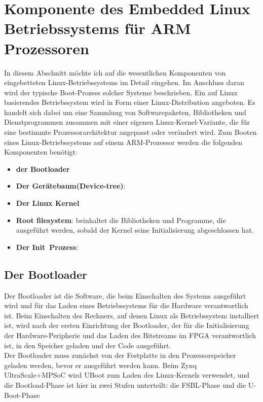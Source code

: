 \section{Komponente des Embedded Linux Betriebssystems für ARM Prozessoren}
\label{cha:tech_grund:sec:Komponente_eines_Emb_Lin_Sys}
In diesem Abschnitt möchte ich auf die wesentlichen Komponenten von eingebetteten Linux-Betriebssystems im Detail eingehen. Im Anschluss daran wird der typische Boot-Prozess solcher Systeme beschrieben.
Ein auf Linux basierendes Betriebssystem wird in Form einer Linux-Distribution angeboten. Es handelt sich dabei um eine Sammlung von Softwarepaketen, Bibliotheken und Dienstprogrammen zusammen mit einer eigenen Linux-Kernel-Variante, die für eine bestimmte Prozessorarchitektur angepasst oder verändert wird. 
Zum Booten eines Linux-Betriebssystems auf einem ARM-Prozessor werden die folgenden Komponenten benötigt:

\begin{itemize}
	\item \textbf{der Bootloader} 
	\item \textbf{Der Gerätebaum(Device-tree)}:
	\item \textbf{Der Linux Kernel}
	\item \textbf{Root filesystem}: beinhaltet die Bibliotheken und Programme, die ausgeführt werden, sobald der Kernel seine Initialisierung abgeschlossen hat.
	\item \textbf{Der \grqq Init\grqq\ Prozess}:
\end{itemize}

\subsection{Der Bootloader}
\cite{Dervis2013}Der Bootloader ist die Software, die beim Einschalten des Systems ausgeführt wird und für das Laden eines Betriebssystems für die Hardware verantwortlich ist. Beim Einschalten des Rechners, auf denen Linux als Betriebssystem installiert ist, wird nach der ersten Einrichtung der Bootloader, der für die Initialisierung der Hardware-Peripherie und das Laden des Bitstreams im FPGA verantwortlich ist, in den Speicher geladen und der Code ausgeführt.\\
Der Bootloader muss zunächst von der Festplatte in den Prozessorspeicher geladen werden, bevor er ausgeführt werden kann. Beim Zynq UltraScale+MPSoC wird UBoot zum Laden des Linux-Kernels verwendet, und die Bootload-Phase ist hier in zwei Stufen unterteilt: die FSBL-Phase und die U-Boot-Phase

